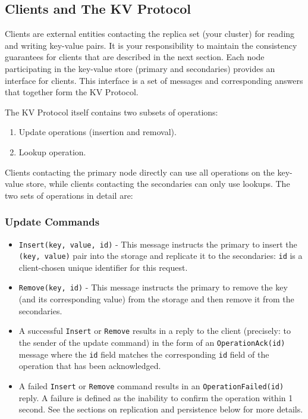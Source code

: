 \documentclass{article}
\begin{document}
\subsection{Clients and The KV Protocol}\label{ss:clientsandkv}

Clients are external entities contacting the replica set (your cluster) for reading and writing key-value pairs. It is your responsibility to maintain the consistency guarantees for clients that are described in the next section. Each node participating in the key-value store (primary and secondaries) provides an interface for clients. This interface is a set of messages and corresponding answers that together form the KV Protocol.

The KV Protocol itself contains two subsets of operations:
\begin{enumerate}
  \item Update operations (insertion and removal).
  \item Lookup operation.
\end{enumerate}
Clients contacting the primary node directly can use all operations on the key-value store, while clients contacting the secondaries can only use lookups. The two sets of operations in detail are:
\subsubsection{Update Commands}
\begin{itemize}
  \item \texttt{Insert(key, value, id)} - This message instructs the primary to insert the \texttt{(key, value)} pair into the storage and replicate it to the secondaries: \texttt{id} is a client-chosen unique identifier for this request.
  \item \texttt{Remove(key, id)} - This message instructs the primary to remove the key (and its corresponding value) from the storage and then remove it from the secondaries. 
  \item 	A successful \texttt{Insert} or \texttt{Remove} results in a reply to the client (precisely: to the sender of the update command) in the form of an \texttt{OperationAck(id)} message where the \texttt{id} field matches the corresponding \texttt{id} field of the operation that has been acknowledged.
  \item A failed \texttt{Insert} or \texttt{Remove} command results in an \texttt{OperationFailed(id)} reply. A failure is defined as the inability to confirm the operation within 1 second. See the sections on replication and persistence below for more details.
\end{itemize} 
\end{document}
